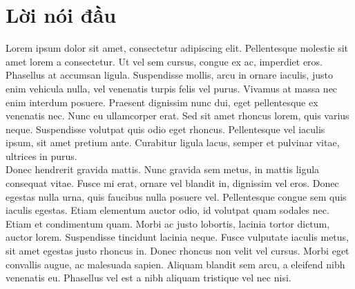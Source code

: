 \thispagestyle{empty} %
\section*{Lời nói đầu}

Lorem ipsum dolor sit amet, consectetur adipiscing elit. Pellentesque molestie sit amet lorem a consectetur. Ut vel sem cursus, congue ex ac, imperdiet eros. Phasellus at accumsan ligula. Suspendisse mollis, arcu in ornare iaculis, justo enim vehicula nulla, vel venenatis turpis felis vel purus. Vivamus at massa nec enim interdum posuere. Praesent dignissim nunc dui, eget pellentesque ex venenatis nec. Nunc eu ullamcorper erat. Sed sit amet rhoncus lorem, quis varius neque. Suspendisse volutpat quis odio eget rhoncus. Pellentesque vel iaculis ipsum, sit amet pretium ante. Curabitur ligula lacus, semper et pulvinar vitae, ultrices in purus.\\

Donec hendrerit gravida mattis. Nunc gravida sem metus, in mattis ligula consequat vitae. Fusce mi erat, ornare vel blandit in, dignissim vel eros. Donec egestas nulla urna, quis faucibus nulla posuere vel. Pellentesque congue sem quis iaculis egestas. Etiam elementum auctor odio, id volutpat quam sodales nec. Etiam et condimentum quam. Morbi ac justo lobortis, lacinia tortor dictum, auctor lorem. Suspendisse tincidunt lacinia neque. Fusce vulputate iaculis metus, sit amet egestas justo rhoncus in. Donec rhoncus non velit vel cursus. Morbi eget convallis augue, ac malesuada sapien. Aliquam blandit sem arcu, a eleifend nibh venenatis eu. Phasellus vel est a nibh aliquam tristique vel nec nisi.